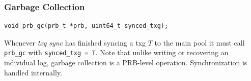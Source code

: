 \documentclass[12pt,a4paper,twoside]{book}
\begin{document}
\subsubsection{Garbage Collection}

\begin{lstlisting}
void prb_gc(prb_t *prb, uint64_t synced_txg);
\end{lstlisting}

Whenever \textit{txg sync} has finished syncing a txg $T$ to the main pool it must call \lstinline{prb_gc} with \lstinline{synced_txg = T}.
Note that unlike writing or recovering an individual log, garbage collection is a PRB-level operation.
Synchronization is handled internally.


\end{document}
